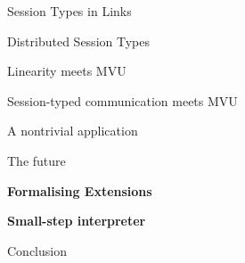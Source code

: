 \documentclass[11.5pt, aspectratio=169]{beamer}
\begin{document}


\begin{frame}{Session Types in Links}
\end{frame}

\begin{frame}{Distributed Session Types}
\end{frame}

\begin{frame}{Linearity meets MVU}
\end{frame}

\begin{frame}{Session-typed communication meets MVU}
\end{frame}

\begin{frame}{A nontrivial application}
\end{frame}


\begin{frame}{The future}
  \begin{fullpageitemize}
    \item {\large \textbf{Formalising Extensions}}
    \item {\large \textbf{Small-step interpreter}}
  \end{fullpageitemize}
\end{frame}

\begin{frame}{Conclusion}
\end{frame}
\end{document}

